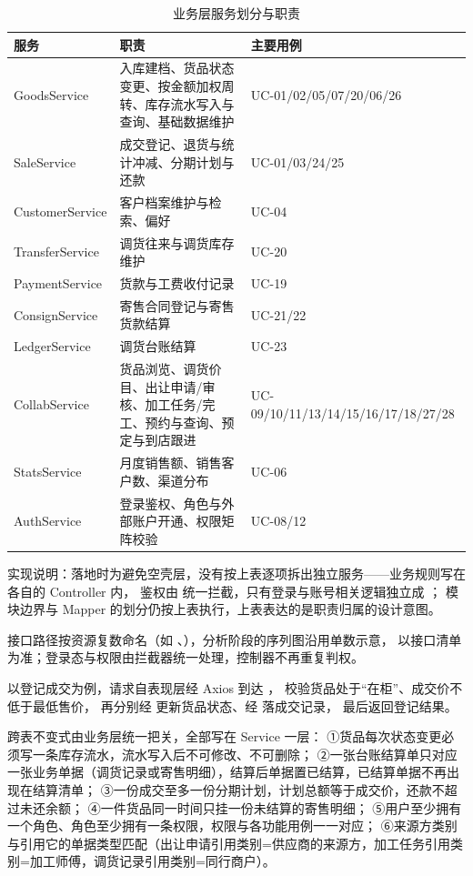 \begin{table}[H]
\centering
\small
\caption{业务层服务划分与职责}
\label{tab:services}
\begin{tabularx}{\textwidth}{@{}l Y l@{}}
\toprule
服务 & 职责 & 主要用例 \\
\midrule
GoodsService & 入库建档、货品状态变更、按金额加权周转、库存流水写入与查询、基础数据维护 & UC-01/02/05/07/20/06/26 \\
SaleService & 成交登记、退货与统计冲减、分期计划与还款 & UC-01/03/24/25 \\
CustomerService & 客户档案维护与检索、偏好 & UC-04 \\
TransferService & 调货往来与调货库存维护 & UC-20 \\
PaymentService & 货款与工费收付记录 & UC-19 \\
ConsignService & 寄售合同登记与寄售货款结算 & UC-21/22 \\
LedgerService & 调货台账结算 & UC-23 \\
CollabService & 货品浏览、调货价目、出让申请/审核、加工任务/完工、预约与查询、预定与到店跟进 & UC-09/10/11/13/14/15/16/17/18/27/28 \\
StatsService & 月度销售额、销售客户数、渠道分布 & UC-06 \\
AuthService & 登录鉴权、角色与外部账户开通、权限矩阵校验 & UC-08/12 \\
\bottomrule
\end{tabularx}
\end{table}

实现说明：落地时为避免空壳层，没有按上表逐项拆出独立服务——业务规则写在各自的 Controller 内，
鉴权由  统一拦截，只有登录与账号相关逻辑独立成 ；
模块边界与 Mapper 的划分仍按上表执行，上表表达的是职责归属的设计意图。

接口路径按资源复数命名（如 、），分析阶段的序列图沿用单数示意，
以接口清单为准；登录态与权限由拦截器统一处理，控制器不再重复判权。

以登记成交为例，请求自表现层经 Axios 到达 ，
 校验货品处于“在柜”、成交价不低于最低售价，
再分别经  更新货品状态、经  落成交记录，
最后返回登记结果。

跨表不变式由业务层统一把关，全部写在 Service 一层：
①货品每次状态变更必须写一条库存流水，流水写入后不可修改、不可删除；
②一张台账结算单只对应一张业务单据（调货记录或寄售明细），结算后单据置已结算，已结算单据不再出现在结算清单；
③一份成交至多一份分期计划，计划总额等于成交价，还款不超过未还余额；
④一件货品同一时间只挂一份未结算的寄售明细；
⑤用户至少拥有一个角色、角色至少拥有一条权限，权限与各功能用例一一对应；
⑥来源方类别与引用它的单据类型匹配（出让申请引用类别=供应商的来源方，加工任务引用类别=加工师傅，调货记录引用类别=同行商户）。

